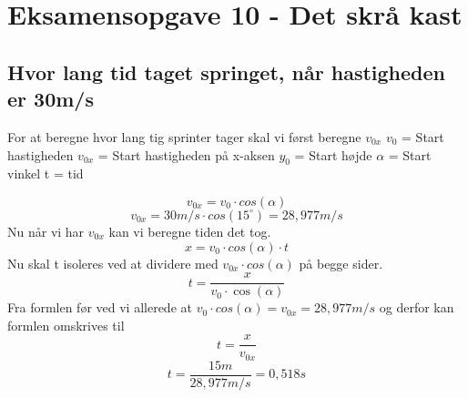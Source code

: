 \newpage
\section{Eksamensopgave 10 - Det skrå kast}
\subsection{Hvor lang tid taget springet, når hastigheden er 30m/s}
For at beregne hvor lang tig sprinter tager skal vi først beregne \begin{math}v_{0x}\end{math}\newline
\begin{math}v_{0}\end{math} = Start hastigheden\newline
\begin{math}v_{0x}\end{math} = Start hastigheden på x-aksen\newline
\begin{math}y_{0}\end{math} = Start højde\newline
\begin{math}\alpha\end{math} = Start vinkel\newline
t = tid

\begin{equation*}
    v_{0x}=v_{0}\cdot cos(\alpha)
\end{equation*}
\begin{equation*}
    v_{0x}=30m/s\cdot cos(15^{\circ}) = 28,977 m/s
\end{equation*}
Nu når vi har \begin{math}v_{0x}\end{math} kan vi beregne tiden det tog.
\begin{equation*}
    x=v_{0}\cdot cos(\alpha)\cdot t
\end{equation*}
Nu skal t isoleres ved at dividere med \begin{math}v_{0x}\cdot cos(\alpha)\end{math} på begge sider.
\begin{equation*}
    t=\frac{x}{v_{0}\cdot \cos(\alpha)}
\end{equation*}
Fra formlen før ved vi allerede at \begin{math}v_{0}\cdot cos(\alpha) = v_{0x} = 28,977m/s\end{math} og derfor kan formlen omskrives til
\begin{equation*}
    t=\frac{x}{v_{0x}}
\end{equation*}
\begin{equation*}
    t=\frac{15m}{28,977m/s} = 0,518 s
\end{equation*}



